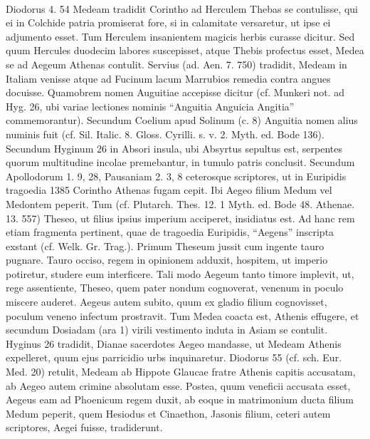 \documentclass[a4paper, 11pt, oneside, polutonikogreek, german]{article}
\begin{document}
\paragraph{}
Diodorus 4. 54 Medeam tradidit Corintho ad Herculem Thebas se contulisse, qui ei in Colchide patria promiserat fore, si in calamitate versaretur, ut ipse ei adjumento esset. Tum Herculem insanientem magicis herbis curasse dicitur. Sed quum Hercules duodecim labores suscepisset, atque Thebis profectus esset, Medea se ad Aegeum Athenas contulit. Servius (ad. Aen. 7. 750) tradidit, Medeam in Italiam venisse atque ad Fucinum lacum Marrubios remedia contra angues docuisse. Quamobrem nomen Auguitiae accepisse dicitur (cf. Munkeri not. ad Hyg. 26, ubi variae lectiones nominis "`Anguitia Anguicia Angitia"' commemorantur). Secundum Coelium apud Solinum (c. 8) Anguitia nomen alius numinis fuit (cf. Sil. Italic. 8. Gloss. Cyrilli. s. v. 2. Myth. ed. Bode 136). Secundum Hyginum 26 in Absori insula, ubi Absyrtus sepultus est, serpentes quorum multitudine incolae premebantur, in tumulo patris conclusit. Secundum Apollodorum 1. 9, 28, Pausaniam 2. 3, 8 ceterosque scriptores, ut in Euripidis tragoedia 1385 Corintho Athenas fugam cepit. Ibi Aegeo filium Medum vel Medontem peperit. Tum (cf. Plutarch. Thes. 12. 1 Myth. ed. Bode 48. Athenae. 13. 557) Theseo, ut filius ipsius imperium acciperet, insidiatus est. Ad hanc rem etiam fragmenta pertinent, quae de tragoedia Euripidis, "`Aegens"' inscripta exstant (cf. Welk. Gr. Trag.). Primum Theseum jussit cum ingente tauro pugnare. Tauro occiso, regem in opinionem adduxit, hospitem, ut imperio potiretur, studere eum interficere. Tali modo Aegeum tanto timore implevit, ut, rege assentiente, Theseo, quem pater nondum cognoverat, venenum in poculo miscere auderet. Aegeus autem subito, quum ex gladio filium cognovisset, poculum veneno infectum prostravit. Tum Medea coacta est, Athenis effugere, et secundum Dosiadam (ara 1) virili vestimento induta in Asiam se contulit. Hyginus 26 tradidit, Dianae sacerdotes Aegeo mandasse, ut Medeam Athenis expelleret, quum ejus parricidio urbs inquinaretur. Diodorus 55 (cf. sch. Eur. Med. 20) retulit, Medeam ab Hippote Glaucae fratre Athenis capitis accusatam, ab Aegeo autem crimine absolutam esse. Postea, quum veneficii accusata esset, Aegeus eam ad Phoenicum regem duxit, ab eoque in matrimonium ducta filium Medum peperit, quem Hesiodus et Cinaethon, Jasonis filium, ceteri autem scriptores, Aegei fuisse, tradiderunt.
\end{document}
